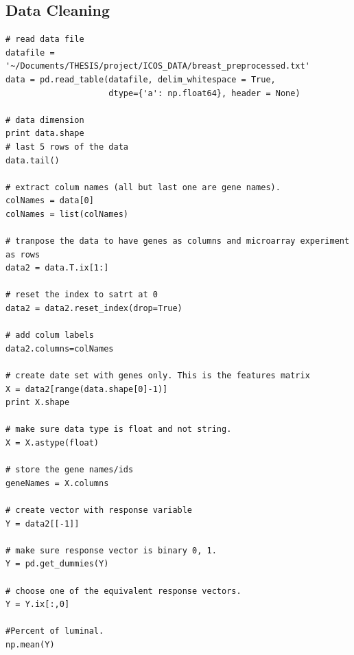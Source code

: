 \documentclass[12pt,a4paper]{article}
\begin{document}
\subsection*{Data Cleaning}
\begin{verbatim}
# read data file
datafile = '~/Documents/THESIS/project/ICOS_DATA/breast_preprocessed.txt'
data = pd.read_table(datafile, delim_whitespace = True, 
                     dtype={'a': np.float64}, header = None)
                     
# data dimension
print data.shape
# last 5 rows of the data
data.tail()

# extract colum names (all but last one are gene names).
colNames = data[0]
colNames = list(colNames)

# tranpose the data to have genes as columns and microarray experiment as rows
data2 = data.T.ix[1:]

# reset the index to satrt at 0
data2 = data2.reset_index(drop=True)

# add colum labels
data2.columns=colNames

# create date set with genes only. This is the features matrix
X = data2[range(data.shape[0]-1)]
print X.shape

# make sure data type is float and not string.
X = X.astype(float)

# store the gene names/ids
geneNames = X.columns

# create vector with response variable
Y = data2[[-1]]

# make sure response vector is binary 0, 1.
Y = pd.get_dummies(Y)

# choose one of the equivalent response vectors.
Y = Y.ix[:,0]

#Percent of luminal.
np.mean(Y)
\end{verbatim}
\end{document}
